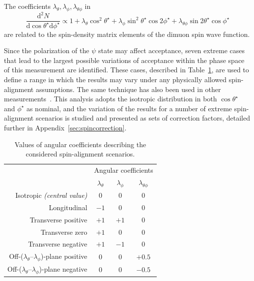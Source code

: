 The coefficients $\lambda_{\theta}, \lambda_{\phi}, \lambda_{\theta\phi}$ in
\begin{equation*}
\frac{\mathrm{d}^2N}{\mathrm{d}\cos\theta^{\star}\mathrm{d}\phi^{\star}} \propto 1 + \lambda_{\theta} \cos^2\theta^{\star} + \lambda_{\phi} \sin^2\theta^{\star}\cos2\phi^{\star} +  \lambda_{\theta\phi} \sin2\theta^{\star}\cos\phi^{\star}
\label{equ:acc}
\end{equation*}
\noindent are related to the spin-density matrix elements of the dimuon spin wave function. 

Since the polarization of the $\psi$ state may affect acceptance, seven extreme cases that lead to the largest possible variations of 
acceptance within the phase space of this measurement are identified.
These cases, described in Table~\ref{tab:spin}, are used to define a range in which the results may vary under any physically allowed spin-alignment assumptions.
The same technique has also been used in other measurements~\cite{Aad:2014fpa,ATLAS:2014ala,Aad2012dlq}.
This analysis adopts the isotropic distribution in both $\cos\theta^{\star}$ and $\phi^{\star}$ as  nominal,
and the variation of the results for a  number of extreme spin-alignment scenarios is studied and presented as sets of correction factors,
 detailed further in Appendix~\ref{sec:spincorrection}.
 
\begin{table}[htbp]
\begin{center}
\caption{Values of angular coefficients describing the considered spin-alignment scenarios.}
\vspace{2mm}
\begin{tabular}[h]{r|ccc}
\hline\hline
      & \multicolumn{3}{c}{Angular coefficients} \\ 
      & $\lambda_{\theta}$ & $\lambda_{\phi}$ & $\lambda_{\theta\phi}$ \\ \hline
Isotropic {\em (central value)}            & $0$ & $0$ & $0$ \\
Longitudinal         & $-1$ & $0$ & $0$ \\
Transverse positive  & $+1$ & $+1$ & $0$ \\
Transverse zero      & $+1$                & $0$ & $0$ \\
Transverse negative  & $+1$            & $-1$ & $0$ \\
Off-($\lambda_{\theta}$--$\lambda_{\phi}$)-plane positive   & $0$ & $0$ & $+0.5$ \\
Off-($\lambda_{\theta}$--$\lambda_{\phi}$)-plane negative   & $0$ & $0$ & $-0.5$ \\
\hline\hline
\end{tabular}
\label{tab:spin}
\end{center}
\end{table}


